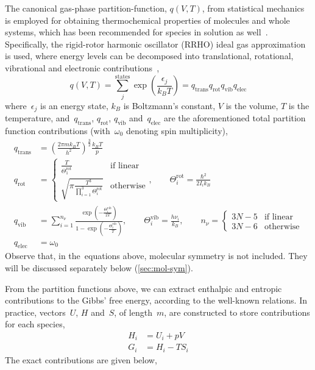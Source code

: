 The canonical gas-phase partition-function,
$q(V,
	T)$,
from statistical mechanics is employed for obtaining thermochemical properties of molecules and whole systems,
which has been recommended for species in solution as well~\cite{Ribeiro_2011}.
Specifically,
the rigid-rotor harmonic oscillator (RRHO) ideal gas approximation is used,
where energy levels can be decomposed into translational,
rotational,
vibrational and electronic contributions~\cite{McQuarrie_1997},
%
\begin{equation}
	q(V,
	T) = \sum_j^\text{states} \exp \left( \frac{\epsilon_j}{k_B T} \right)
	= q_\text{trans}
	q_\text{rot}
	q_\text{vib}
	q_\text{elec}
\end{equation}
%
where~$\epsilon_j$ is an energy state,
$k_B$ is Boltzmann's constant,
$V$ is the volume,
$T$ is the temperature,
and~$q_\text{trans}$,
$q_\text{rot}$,
$q_\text{vib}$ and~$q_\text{elec}$ are the aforementioned total partition function contributions (with~$\omega_0$ denoting spin multiplicity),
%
\begin{equation}
	\begin{split}
		q_\text{trans}
		&= \left(
		\frac{2 \pi m k_B T}{h^2}
		\right)^\frac{3}{2}
		\frac{k_B T}{p} \\
		q_\text{rot}
		&= \begin{cases}
			\frac{T}{\Theta^\text{rot}_1}
			 & \text{if linear} \\
			\sqrt{
				\pi
				\frac{T^3}{
					\prod_{i = 1}^{3} \Theta^\text{rot}_i
				}
			}
			 & \text{otherwise}
		\end{cases},
		\qquad
		\Theta^\text{rot}_i = \frac{\hbar^2}{2 I_i k_B} \\
		q_\text{vib}
		&= \sum_{i = 1}^{n_\nu}
		\frac{
			\exp\left(
			- \frac{\Theta^\text{vib}_i}{2 T}
			\right)
		}{
			1 - \exp\left(
			- \frac{\Theta^\text{vib}_i
			}{T}
			\right)
		},
		\qquad
		\Theta^\text{vib}_i = \frac{h \nu_i}{k_B},
		\qquad
		n_\nu = \begin{cases}
			3 N - 5 & \text{if linear} \\
			3 N - 6 & \text{otherwise}
		\end{cases}
		\\
		q_\text{elec}
		&= \omega_0
	\end{split}
\end{equation}
%
Observe that,
in the~equations above,
molecular symmetry is not included.
They will be discussed separately below (\cref{sec:mol-sym}).

From the partition functions above,
we can extract enthalpic and entropic contributions to the Gibbs' free energy,
according to the well-known relations.
In practice,
vectors~$U$,
$H$ and~$S$,
of length~$m$,
are constructed to store contributions for each species,
%
\begin{equation}
	\begin{split}
		H_i &= U_i + p V \\
		G_i & = H_i - T S_i
	\end{split}
\end{equation}
%
The exact contributions are given below,

